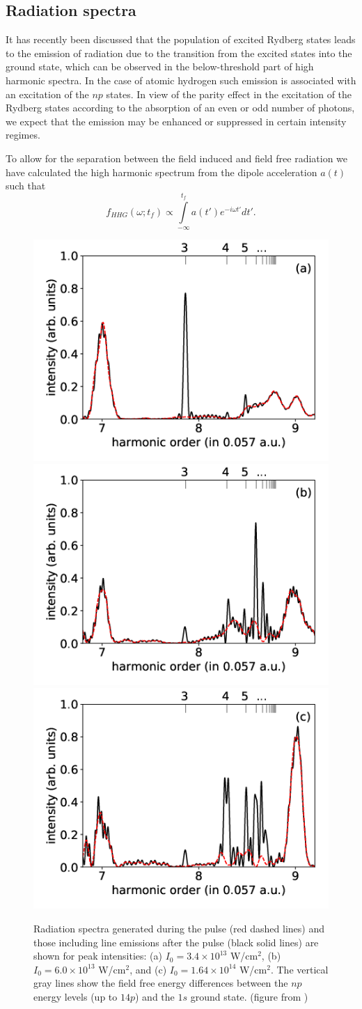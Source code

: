\subsection{Radiation spectra}
\label{sub:radiation}

It has recently been discussed \cite{chini2014,camp2015,beaulieu2016} that the population of excited Rydberg states leads to the emission of radiation due to the transition from the excited states into the ground state, which can be observed in the below-threshold part of high harmonic spectra. In the case of atomic hydrogen such emission is associated with an excitation of the $np$ states. In view of the parity effect in the excitation of the Rydberg states according to the absorption of an even or odd number of photons, we expect that the emission may be enhanced or suppressed in certain intensity regimes.

To allow for the separation between the field induced and field free radiation we have calculated the high harmonic spectrum from the dipole acceleration $a(t)$ such that
%
\begin{equation}
f_{HHG}(\omega; t_f)  \propto \int\limits_{-\infty}^{t_f}  a(t') e^{-i\omega t'} dt'.
\end{equation}

\begin{figure}[!ht]
\centering
\includegraphics[width=0.32\columnwidth]{figs/Rydberg/HHG_3p4e13.png}
\includegraphics[width=0.32\columnwidth]{figs/Rydberg/HHG_6p0e13.png}
\includegraphics[width=0.32\columnwidth]{figs/Rydberg/HHG_16p4e13.png}
\caption{Radiation spectra generated during the pulse (red dashed lines) and those including line emissions after the pulse (black solid lines) are shown for peak intensities:
(a) $I_0 = 3.4\times10^{13}$ W/cm$^2$, 
(b) $I_0 = 6.0\times10^{13}$ W/cm$^2$, and
(c) $I_0 = 1.64\times10^{14}$ W/cm$^2$.
The vertical gray lines show the field free energy differences between the $np$ energy levels (up to $14p$) and the $1s$ ground state. (figure from \cite{venzke2018_ryd})
}
\label{fig:HHG_6_10}
\end{figure}

